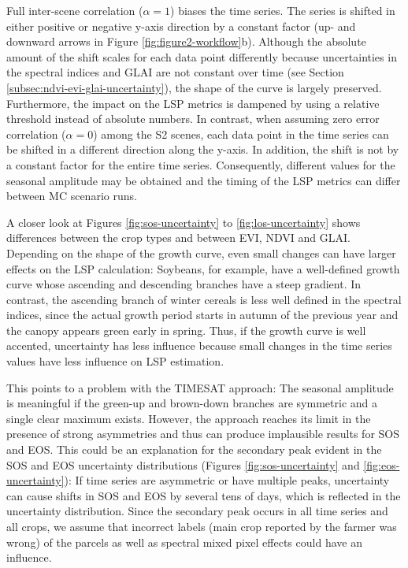 Full inter-scene correlation ($\alpha = 1$) biases the time series. The series is shifted in either positive or negative y-axis direction by a constant factor (up- and downward arrows in Figure \ref{fig:figure2-workflow}b). Although the absolute amount of the shift scales for each data point differently because uncertainties in the spectral indices and \gls{GLAI} are not constant over time (see Section \ref{subsec:ndvi-evi-glai-uncertainty}), the shape of the curve is largely preserved. Furthermore, the impact on the \gls{LSP} metrics is dampened by using a relative threshold instead of absolute numbers. In contrast, when assuming zero error correlation ($\alpha = 0$) among the \gls{S2} scenes, each data point in the time series can be shifted in a different direction along the y-axis. In addition, the shift is not by a constant factor for the entire time series. Consequently, different values for the seasonal amplitude may be obtained and the timing of the \gls{LSP} metrics can differ between  \gls{MC} scenario runs.

A closer look at Figures \ref{fig:sos-uncertainty} to \ref{fig:los-uncertainty} shows differences between the crop types and between EVI, \gls{NDVI} and GLAI. Depending on the shape of the growth curve, even small changes can have larger effects on the \gls{LSP} calculation: Soybeans, for example, have a well-defined growth curve whose ascending and descending branches have a steep gradient. In contrast, the ascending branch of winter cereals is less well defined in the spectral indices, since the actual growth period starts in autumn of the previous year and the canopy appears green early in spring. Thus, if the growth curve is well accented, uncertainty has less influence because small changes in the time series values have less influence on \gls{LSP} estimation.

This points to a problem with the TIMESAT approach: The seasonal amplitude is meaningful if the green-up and brown-down branches are symmetric and a single clear maximum exists. However, the approach reaches its limit in the presence of strong asymmetries and thus can produce implausible results for \gls{SOS} and EOS. This could be an explanation for the secondary peak evident in the \gls{SOS} and \gls{EOS} uncertainty distributions (Figures \ref{fig:sos-uncertainty} and \ref{fig:eos-uncertainty}): If time series are asymmetric or have multiple peaks, uncertainty can cause shifts in \gls{SOS} and \gls{EOS} by several tens of days, which is reflected in the uncertainty distribution. Since the secondary peak occurs in all time series and all crops, we assume that incorrect labels (main crop reported by the farmer was wrong) of the parcels as well as spectral mixed pixel effects could have an influence.

